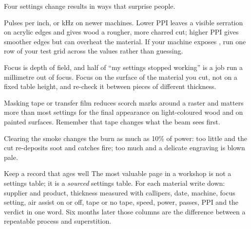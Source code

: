 Four settings change results in ways that surprise people.

\begin{description}[leftmargin=1.4em,style=nextline]
  \item[PPI / frequency] Pulses per inch, or kHz on newer machines. Lower PPI
        leaves a visible serration on acrylic edges and gives wood a rougher,
        more charred cut; higher PPI gives smoother edges but can overheat the
        material. If your machine exposes , run one row of your
        test grid across the values rather than guessing.
  \item[Focus and material height] Focus is depth of field, and half of
        ``my settings stopped working'' is a job run a millimetre out of focus.
        Focus on the surface of the material you cut, not on a fixed table
        height, and re-check it between pieces of different thickness.
  \item[Masking and surface protection] Masking tape or transfer film reduces
        scorch marks around a raster and matters more than most settings for
        the final appearance on light-coloured wood and on painted surfaces.
        Remember that tape changes what the beam sees first.
  \item[Air assist] Clearing the smoke changes the burn as much as 10\% of power:
        too little and the cut re-deposits soot and catches fire; too much and a
        delicate engraving is blown pale.
\end{description}

\begin{machinebox}{Keep a record that ages well}
The most valuable page in a workshop is not a settings table; it is a
\emph{sourced} settings table. For each material write down: supplier and
product, thickness measured with callipers, date, machine, focus setting, air
assist on or off, tape or no tape, speed, power, passes, PPI and the verdict in
one word. Six months later those columns are the difference between a repeatable
process and superstition.
\end{machinebox}

